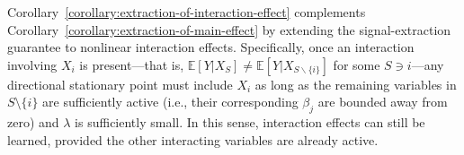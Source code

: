 \documentclass[sn-mathphys-num]{sn-jnl}%
\numberwithin{equation}{section}
\newcommand{\E}{\mathbb{E}}
\theoremstyle{thmstyleone}%
\theoremstyle{thmstyletwo}%
\theoremstyle{thmstylethree}%
\begin{document}
Corollary~\ref{corollary:extraction-of-interaction-effect} complements Corollary~\ref{corollary:extraction-of-main-effect} by extending the signal-extraction guarantee to nonlinear interaction effects. Specifically, once an interaction involving $X_i$ is present---that is, $\E[Y|X_S] \ne \E[Y|X_{S \backslash \{i\}}]$ for some $S \ni i$---any directional stationary point must include $X_i$ as long as the remaining variables in $S \setminus \{i\}$ are sufficiently active (i.e., their corresponding $\beta_j$ are bounded away from zero) and $\lambda$ is sufficiently small. In this sense, interaction effects can still be learned, provided the other interacting variables are already active.


\end{document}

